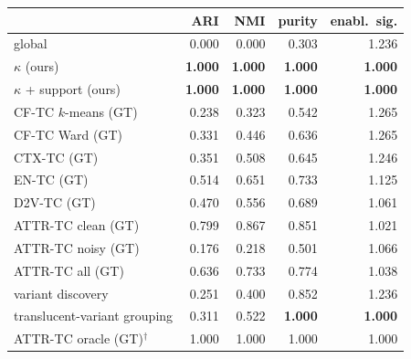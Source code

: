 \begin{tabular}{lrrrr}
\toprule
 & ARI & NMI & purity & enabl.\ sig. \\
\midrule
global & 0.000 & 0.000 & 0.303 & 1.236 \\
$\kappa$ (ours) & \textbf{1.000} & \textbf{1.000} & \textbf{1.000} & \textbf{1.000} \\
$\kappa$ + support (ours) & \textbf{1.000} & \textbf{1.000} & \textbf{1.000} & \textbf{1.000} \\
CF-TC $k$-means (GT) & 0.238 & 0.323 & 0.542 & 1.265 \\
CF-TC Ward (GT) & 0.331 & 0.446 & 0.636 & 1.265 \\
CTX-TC (GT) & 0.351 & 0.508 & 0.645 & 1.246 \\
EN-TC (GT) & 0.514 & 0.651 & 0.733 & 1.125 \\
D2V-TC (GT) & 0.470 & 0.556 & 0.689 & 1.061 \\
ATTR-TC clean (GT) & 0.799 & 0.867 & 0.851 & 1.021 \\
ATTR-TC noisy (GT) & 0.176 & 0.218 & 0.501 & 1.066 \\
ATTR-TC all (GT) & 0.636 & 0.733 & 0.774 & 1.038 \\
variant discovery & 0.251 & 0.400 & 0.852 & 1.236 \\
translucent-variant grouping & 0.311 & 0.522 & \textbf{1.000} & \textbf{1.000} \\
ATTR-TC oracle (GT)$^{\dagger}$ & 1.000 & 1.000 & 1.000 & 1.000 \\
\bottomrule
\end{tabular}
